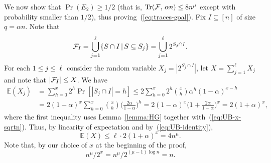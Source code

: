 \documentclass[11pt]{article}
\newcommand{\FF}{{\cal F}}
\renewcommand{\a}{\alpha}
\newcommand{\sub}{\subseteq}
\newcommand{\Ex}{\mathbb{E}}
\newcommand{\C}{\mu}
\DeclareMathOperator{\trace}{Tr}
\begin{document}
We now show that $\Pr(E_2) \ge 1/2$ (that is, $\trace(\FF,\,\a n) \le 8n^\C$ except with probability smaller than $1/2$), thus proving~(\ref{eq:traces-goal}).
Fix $I \sub [n]$ of size $q=\a n$.
Note that 
$$\FF_I = \bigcup_{j=1}^\ell \{ S \cap I \,\vert\, S \sub S_j \} = \bigcup_{j=1}^\ell 2^{S_j \cap I}.$$
For each $1 \le j \le \ell$ consider the random variable $X_j = |2^{S_j \cap I}|$, 
let $X=\sum_{j=1}^\ell X_j$ and note that $|\FF_I| \le X$.
We have
%
\begin{align*}
\Ex(X_j) &= \sum_{h=0}^x 2^h\Pr[|S_j \cap I|=h]
\le 2\sum_{h=0}^x 2^h \binom{x}{h} \a^h (1-\a)^{x-h}\\
&= 2(1-\a)^x\sum_{h=0}^x\binom{x}{h} \Big(\frac{2\a}{1-\a}\Big)^h
= 2(1-\a)^x \Big(1 + \frac{2\a}{1-\a}\Big)^x
= 2(1+\a)^x,
\end{align*}
where the first inequality uses Lemma~\ref{lemma:HG} together with~(\ref{eq:UB-x-sqrtn}).
Thus, by linearity of expectation and by~(\ref{eq:UB-identity}),
\begin{equation}\label{eq:Expectation}
\Ex(X) \le \ell \cdot 2(1+\a)^x  = 4n^{\C} .
\end{equation}
Note that, by our choice of $x$ at the beginning of the proof,
\begin{equation}\label{eq:UB-traces-normalized}
n^\C/2^x = n^\C/2^{(\C-1)\log n} = n.
\end{equation}
\end{document}
